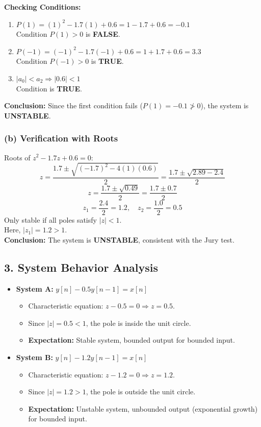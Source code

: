 \documentclass[11pt, a4paper]{article}
\begin{document}
\textbf{Checking Conditions:}
\begin{enumerate}
    \item $P(1) = (1)^2 - 1.7(1) + 0.6 = 1 - 1.7 + 0.6 = -0.1$ \\
    Condition $P(1) > 0$ is \textbf{FALSE}.
    \item $P(-1) = (-1)^2 - 1.7(-1) + 0.6 = 1 + 1.7 + 0.6 = 3.3$ \\
    Condition $P(-1) > 0$ is \textbf{TRUE}.
    \item $|a_0| < a_2 \Rightarrow |0.6| < 1$ \\
    Condition is \textbf{TRUE}.
\end{enumerate}

\textbf{Conclusion:} Since the first condition fails ($P(1) = -0.1 \ngtr 0$), the system is \textbf{UNSTABLE}.

\subsubsection{(b) Verification with Roots}
Roots of $z^2 - 1.7z + 0.6 = 0$:
$$ z = \frac{1.7 \pm \sqrt{(-1.7)^2 - 4(1)(0.6)}}{2} = \frac{1.7 \pm \sqrt{2.89 - 2.4}}{2} $$
$$ z = \frac{1.7 \pm \sqrt{0.49}}{2} = \frac{1.7 \pm 0.7}{2} $$
$$ z_1 = \frac{2.4}{2} = 1.2, \quad z_2 = \frac{1.0}{2} = 0.5 $$
Only stable if all poles satisfy $|z| < 1$. \\
Here, $|z_1| = 1.2 > 1$. \\
\textbf{Conclusion:} The system is \textbf{UNSTABLE}, consistent with the Jury test.

\subsection{3. System Behavior Analysis}
\begin{itemize}
    \item \textbf{System A:} $y[n] - 0.5y[n-1] = x[n]$
    \begin{itemize}
        \item Characteristic equation: $z - 0.5 = 0 \Rightarrow z = 0.5$.
        \item Since $|z| = 0.5 < 1$, the pole is inside the unit circle.
        \item \textbf{Expectation:} Stable system, bounded output for bounded input.
    \end{itemize}
    \item \textbf{System B:} $y[n] - 1.2y[n-1] = x[n]$
    \begin{itemize}
        \item Characteristic equation: $z - 1.2 = 0 \Rightarrow z = 1.2$.
        \item Since $|z| = 1.2 > 1$, the pole is outside the unit circle.
        \item \textbf{Expectation:} Unstable system, unbounded output (exponential growth) for bounded input.
    \end{itemize}
\end{itemize}
\end{document}
